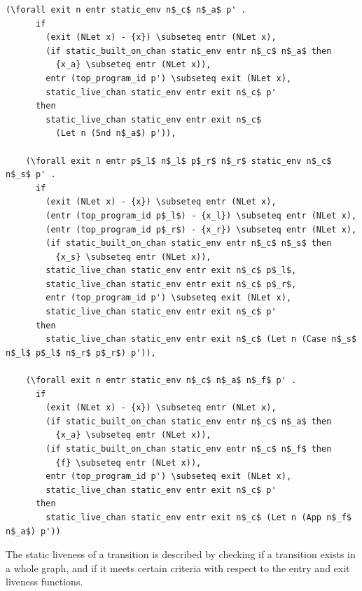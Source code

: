 \documentclass{article}
\begin{document}
\begin{lstlisting}[language=logic, mathescape]
    (\forall exit n entr static_env n$_c$ n$_a$ p' .
      if 
        (exit (NLet x) - {x}) \subseteq entr (NLet x),
        (if static_built_on_chan static_env entr n$_c$ n$_a$ then
          {x_a} \subseteq entr (NLet x)),
        entr (top_program_id p') \subseteq exit (NLet x),
        static_live_chan static_env entr exit n$_c$ p'
      then
        static_live_chan static_env entr exit n$_c$
          (Let n (Snd n$_a$) p')),

    (\forall exit n entr p$_l$ n$_l$ p$_r$ n$_r$ static_env n$_c$ n$_s$ p' .
      if 
        (exit (NLet x) - {x}) \subseteq entr (NLet x),
        (entr (top_program_id p$_l$) - {x_l}) \subseteq entr (NLet x),
        (entr (top_program_id p$_r$) - {x_r}) \subseteq entr (NLet x),
        (if static_built_on_chan static_env entr n$_c$ n$_s$ then
          {x_s} \subseteq entr (NLet x)),
        static_live_chan static_env entr exit n$_c$ p$_l$,
        static_live_chan static_env entr exit n$_c$ p$_r$,
        entr (top_program_id p') \subseteq exit (NLet x),
        static_live_chan static_env entr exit n$_c$ p'
      then 
        static_live_chan static_env entr exit n$_c$ (Let n (Case n$_s$ n$_l$ p$_l$ n$_r$ p$_r$) p')),

    (\forall exit n entr static_env n$_c$ n$_a$ n$_f$ p' .
      if
        (exit (NLet x) - {x}) \subseteq entr (NLet x),
        (if static_built_on_chan static_env entr n$_c$ n$_a$ then
          {x_a} \subseteq entr (NLet x)),
        (if static_built_on_chan static_env entr n$_c$ n$_f$ then
          {f} \subseteq entr (NLet x)),
        entr (top_program_id p') \subseteq exit (NLet x),
        static_live_chan static_env entr exit n$_c$ p'
      then
        static_live_chan static_env entr exit n$_c$ (Let n (App n$_f$ n$_a$) p'))
  \end{lstlisting}

The static liveness of a transition is described by checking if a transition exists in a whole
graph, and if it meets certain criteria with respect to the entry and exit liveness
functions. 
\end{document}
